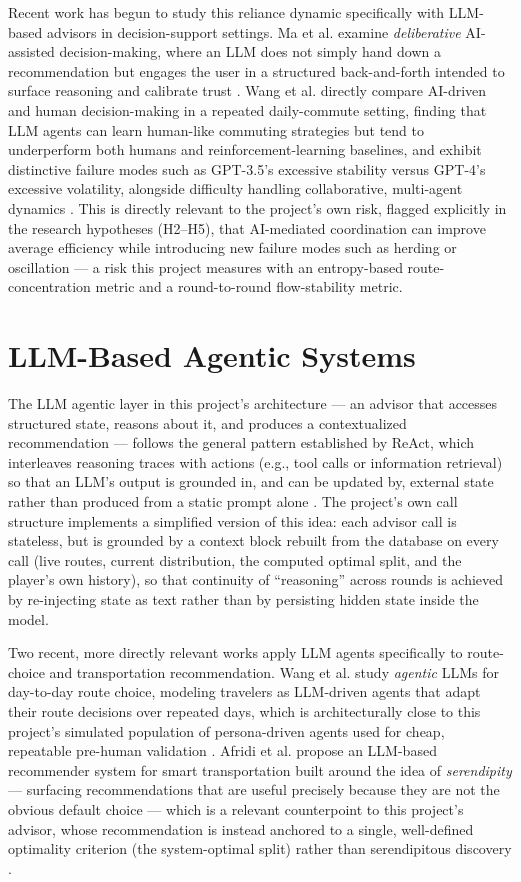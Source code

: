 \documentclass[11pt]{article}
\begin{document}
Recent work has begun to study this reliance dynamic specifically with LLM-based advisors in decision-support settings. Ma et al. examine \emph{deliberative} AI-assisted decision-making, where an LLM does not simply hand down a recommendation but engages the user in a structured back-and-forth intended to surface reasoning and calibrate trust \citep{ma2025deliberation}. Wang et al. directly compare AI-driven and human decision-making in a repeated daily-commute setting, finding that LLM agents can learn human-like commuting strategies but tend to underperform both humans and reinforcement-learning baselines, and exhibit distinctive failure modes such as GPT-3.5's excessive stability versus GPT-4's excessive volatility, alongside difficulty handling collaborative, multi-agent dynamics \citep{wang2025comparing}. This is directly relevant to the project's own risk, flagged explicitly in the research hypotheses (H2--H5), that AI-mediated coordination can improve average efficiency while introducing new failure modes such as herding or oscillation --- a risk this project measures with an entropy-based route-concentration metric and a round-to-round flow-stability metric.

\section{LLM-Based Agentic Systems}
The LLM agentic layer in this project's architecture --- an advisor that accesses structured state, reasons about it, and produces a contextualized recommendation --- follows the general pattern established by ReAct, which interleaves reasoning traces with actions (e.g., tool calls or information retrieval) so that an LLM's output is grounded in, and can be updated by, external state rather than produced from a static prompt alone \citep{yao2023react}. The project's own call structure implements a simplified version of this idea: each advisor call is stateless, but is grounded by a context block rebuilt from the database on every call (live routes, current distribution, the computed optimal split, and the player's own history), so that continuity of ``reasoning'' across rounds is achieved by re-injecting state as text rather than by persisting hidden state inside the model.

Two recent, more directly relevant works apply LLM agents specifically to route-choice and transportation recommendation. Wang et al. study \emph{agentic} LLMs for day-to-day route choice, modeling travelers as LLM-driven agents that adapt their route decisions over repeated days, which is architecturally close to this project's simulated population of persona-driven agents used for cheap, repeatable pre-human validation \citep{wang2024agentic}. Afridi et al. propose an LLM-based recommender system for smart transportation built around the idea of \emph{serendipity} --- surfacing recommendations that are useful precisely because they are not the obvious default choice --- which is a relevant counterpoint to this project's advisor, whose recommendation is instead anchored to a single, well-defined optimality criterion (the system-optimal split) rather than serendipitous discovery \citep{afridi2024serendipity}.
\end{document}
